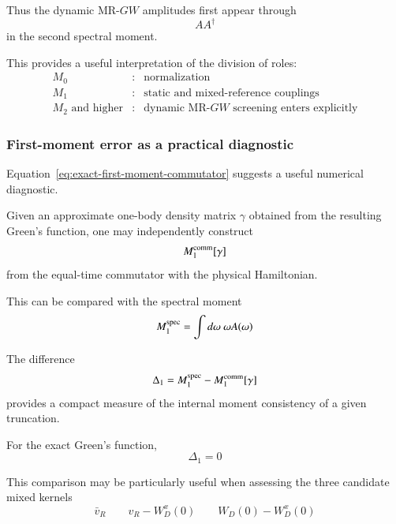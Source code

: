 \documentclass[aip,jcp,reprint,noshowkeys,superscriptaddress]{revtex4-1}
\begin{document}
Thus the dynamic MR-$GW$ amplitudes first appear through
\begin{equation}
  AA^\dagger
\end{equation}
in the second spectral moment.

This provides a useful interpretation of the division of roles:
\begin{equation}
  \begin{array}{rcl}
  M_0
  &:&
  \text{normalization}
  \\[1mm]
  M_1
  &:&
  \text{static and mixed-reference couplings}
  \\[1mm]
  M_2\text{ and higher}
  &:&
  \text{dynamic MR-}GW\text{ screening enters explicitly}
  \end{array}
  \label{eq:moment-role-summary}
\end{equation}


\subsubsection{First-moment error as a practical diagnostic}

Equation~\eqref{eq:exact-first-moment-commutator} suggests a useful
numerical diagnostic.

Given an approximate one-body density matrix $\gamma$ obtained from the
resulting Green's function, one may independently construct
\begin{equation}
  M_1^{\rm comm}[\gamma]
\end{equation}
from the equal-time commutator with the physical Hamiltonian.

This can be compared with the spectral moment
\begin{equation}
  M_1^{\rm spec}
  =
  \int
  d\omega\
  \omega A(\omega)
\end{equation}

The difference
\begin{equation}
  \Delta_1
  =
  M_1^{\rm spec}
  -
  M_1^{\rm comm}[\gamma]
  \label{eq:first-moment-diagnostic}
\end{equation}
provides a compact measure of the internal moment consistency of a
given truncation.

For the exact Green's function,
\begin{equation}
  \Delta_1=0
\end{equation}

This comparison may be particularly useful when assessing the three
candidate mixed kernels
\begin{equation}
  \bar v_R
  \qquad
  v_R-W_D^x(0)
  \qquad
  W_D(0)-W_D^x(0)
\end{equation}
\end{document}
